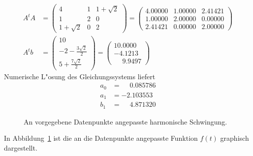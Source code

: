 \begin{loesung}
\begin{align*}
A^tA&=
\begin{pmatrix}
         4&1&1+\sqrt{2}\\
         1&2&         0\\
1+\sqrt{2}&0&         2
\end{pmatrix}
=\begin{pmatrix}
   4.00000 & 1.00000 & 2.41421 \\
   1.00000 & 2.00000 & 0.00000 \\
   2.41421 & 0.00000 & 2.00000
\end{pmatrix}
\\
A^tb&=
\begin{pmatrix}
10\\
-2-\frac{3\sqrt{2}}2\\
5+\frac{7\sqrt{2}}2
\end{pmatrix}
=\begin{pmatrix}
10.0000\\
-4.1213\\
\phantom{-}9.9497
\end{pmatrix}
\end{align*}
Numerische L"osung des Gleichungssystems liefert 
\begin{align*}
a_0&=\phantom{-}0.085786\\
a_1&=-2.103553\\
b_1&=\phantom{-}4.871320
\end{align*}
\begin{figure}
\centering
{}
\caption{An vorgegebene Datenpunkte angepasste harmonische Schwingung.
\label{40000034:1}
}
\end{figure}
In Abbildung~\ref{40000034:1} ist die an die Datenpunkte angepasste
Funktion $f(t)$ graphisch dargestellt.
\end{loesung}

